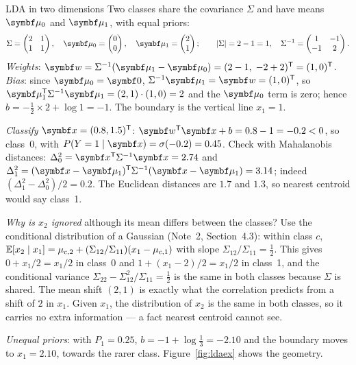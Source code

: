 \documentclass[11pt]{article}
\newcommand{\w}{\vect{w}}
\begin{document}
\begin{worked}{LDA in two dimensions}
Two classes share the covariance $\Sigma$ and have means $\vmu_0$ and $\vmu_1$, with equal priors:
\[
  \Sigma = \begin{pmatrix} 2 & 1 \\ 1 & 1 \end{pmatrix}, \quad
  \vmu_0 = \begin{pmatrix} 0 \\ 0 \end{pmatrix}, \quad
  \vmu_1 = \begin{pmatrix} 2 \\ 1 \end{pmatrix}; \qquad
  \lvert\Sigma\rvert = 2 - 1 = 1, \quad
  \Sigma^{-1} = \begin{pmatrix} 1 & -1 \\ -1 & 2 \end{pmatrix} .
\]
\emph{Weights}: $\w = \Sigma^{-1}(\vmu_1 - \vmu_0) = (2 - 1,\; -2 + 2)\T = (1, 0)\T$.
\emph{Bias}: since $\vmu_0 = \vect{0}$, $\Sigma^{-1}\vmu_1 = \w = (1, 0)\T$, so
$\vmu_1\T \Sigma^{-1} \vmu_1 = (2, 1) \cdot (1, 0) = 2$ and the $\vmu_0$ term is zero; hence
$b = -\tfrac12 \times 2 + \log 1 = -1$. The boundary is the vertical line $x_1 = 1$.

\emph{Classify} $\x = (0.8, 1.5)\T$: $\w\T\x + b = 0.8 - 1 = -0.2 < 0$, so class~0, with
$P(Y = 1 \mid \x) = \sigma(-0.2) = 0.45$. Check with Mahalanobis distances: $\Delta_0^2 = \x\T\Sigma^{-1}\x = 2.74$ and
$\Delta_1^2 = (\x - \vmu_1)\T \Sigma^{-1} (\x - \vmu_1) = 3.14$; indeed $(\Delta_1^2 - \Delta_0^2)/2 = 0.2$.
The Euclidean distances are $1.7$ and $1.3$, so nearest centroid would say class~1.

\emph{Why is $x_2$ ignored} although its mean differs between the classes? Use the conditional distribution of a
Gaussian (Note~2, Section~4.3): within class $c$, $\mathbb{E}[x_2 \mid x_1] = \mu_{c,2} + (\Sigma_{12}/\Sigma_{11})(x_1 -
\mu_{c,1})$ with slope $\Sigma_{12}/\Sigma_{11} = \tfrac12$. This gives $0 + x_1/2 = x_1/2$ in class~0 and
$1 + (x_1 - 2)/2 = x_1/2$ in class~1, and the conditional variance $\Sigma_{22} - \Sigma_{12}^2/\Sigma_{11} = \tfrac12$
is the same in both classes because $\Sigma$ is shared. The mean shift $(2, 1)$ is exactly what the correlation
predicts from a shift of $2$ in $x_1$. Given $x_1$, the distribution of $x_2$ is the same in both classes, so it
carries no extra information --- a fact nearest centroid cannot see.

\emph{Unequal priors}: with $P_1 = 0.25$, $b = -1 + \log\tfrac13 = -2.10$ and the boundary moves to $x_1 = 2.10$,
towards the rarer class. Figure~\ref{fig:ldaex} shows the geometry.
\end{worked}
\end{document}
